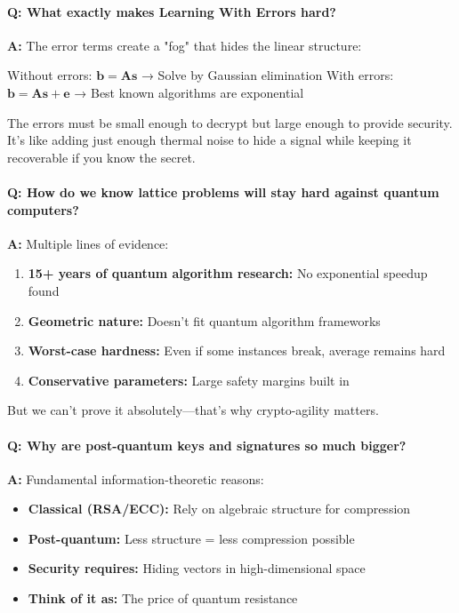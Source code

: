 \documentclass[11pt,a4paper]{article}
\begin{document}
\paragraph{Q: What exactly makes Learning With Errors hard?}

\textbf{A:} The error terms create a "fog" that hides the linear structure:

Without errors: $\mathbf{b} = \mathbf{As}$ → Solve by Gaussian elimination
With errors: $\mathbf{b} = \mathbf{As} + \mathbf{e}$ → Best known algorithms are exponential

The errors must be small enough to decrypt but large enough to provide security. It's like adding just enough thermal noise to hide a signal while keeping it recoverable if you know the secret.

\paragraph{Q: How do we know lattice problems will stay hard against quantum computers?}

\textbf{A:} Multiple lines of evidence:

\begin{enumerate}
    \item \textbf{15+ years of quantum algorithm research:} No exponential speedup found
    \item \textbf{Geometric nature:} Doesn't fit quantum algorithm frameworks
    \item \textbf{Worst-case hardness:} Even if some instances break, average remains hard
    \item \textbf{Conservative parameters:} Large safety margins built in
\end{enumerate}

But we can't prove it absolutely—that's why crypto-agility matters.

\paragraph{Q: Why are post-quantum keys and signatures so much bigger?}

\textbf{A:} Fundamental information-theoretic reasons:

\begin{itemize}
    \item \textbf{Classical (RSA/ECC):} Rely on algebraic structure for compression
    \item \textbf{Post-quantum:} Less structure = less compression possible
    \item \textbf{Security requires:} Hiding vectors in high-dimensional space
    \item \textbf{Think of it as:} The price of quantum resistance
\end{itemize}
\end{document}

